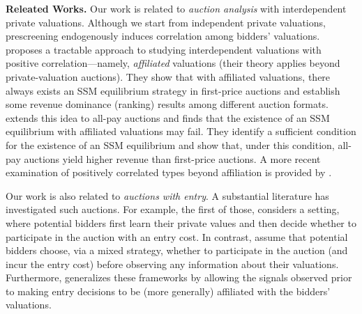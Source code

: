 \noindent
\textbf{Releated Works.}
Our work is related to \textit{auction analysis} with interdependent private valuations. Although we start from independent private valuations, prescreening endogenously induces correlation among bidders' valuations. \citet{milgrom_1982_auctiontheory_competitive_bidding} proposes a tractable approach to studying interdependent valuations with positive correlation—namely, \textit{affiliated} valuations (their theory applies beyond private-valuation auctions). They show that with affiliated valuations, there always exists an SSM equilibrium strategy in first-price auctions and establish some revenue dominance (ranking) results among different auction formats. \citet{krishna_1997_all_pay_affiliation} extends this idea to all-pay auctions and finds that the existence of an SSM equilibrium with affiliated valuations may fail. They identify a sufficient condition for the existence of an SSM equilibrium and show that, under this condition, all-pay auctions yield higher revenue than first-price auctions. A more recent examination of positively correlated types beyond affiliation is provided by \citet{castro_2007_affiliation_positive_dependence}.





Our work is also related to \textit{auctions with entry}. A substantial literature has investigated such auctions. For example, the first of those, \citet{samuelson_1985_entrycosts} considers a setting, where potential bidders first learn their private values and then decide whether to participate in the auction with an entry cost. In contrast, \citet{levin_1994_aer_auctions_entry} assume that potential bidders choose, via a mixed strategy, whether to participate in the auction (and incur the entry cost) before observing any information about their valuations. Furthermore, \citet{gentry_2014_affiliated_signal_entry} generalizes these frameworks by allowing the signals observed prior to making entry decisions to be (more generally) affiliated with the bidders' valuations.


